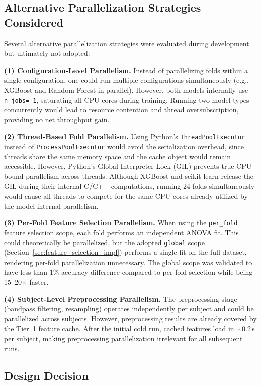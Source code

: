 \subsection{Alternative Parallelization Strategies Considered}
\label{subsec:alt_parallel}

Several alternative parallelization strategies were evaluated during development but ultimately not adopted:

\textbf{(1) Configuration-Level Parallelism.}
Instead of parallelizing folds within a single configuration, one could run multiple configurations simultaneously (e.g., XGBoost and Random Forest in parallel). However, both models internally use \texttt{n\_jobs=-1}, saturating all CPU cores during training. Running two model types concurrently would lead to resource contention and thread oversubscription, providing no net throughput gain.

\textbf{(2) Thread-Based Fold Parallelism.}
Using Python's \texttt{ThreadPoolExecutor} instead of \texttt{ProcessPoolExecutor} would avoid the serialization overhead, since threads share the same memory space and the cache object would remain accessible. However, Python's Global Interpreter Lock (GIL) prevents true CPU-bound parallelism across threads. Although XGBoost and scikit-learn release the GIL during their internal C/C++ computations, running 24 folds simultaneously would cause all threads to compete for the same CPU cores already utilized by the model-internal parallelism.

\textbf{(3) Per-Fold Feature Selection Parallelism.}
When using the \texttt{per\_fold} feature selection scope, each fold performs an independent ANOVA fit. This could theoretically be parallelized, but the adopted \texttt{global} scope (Section~\ref{sec:feature_selection_impl}) performs a single fit on the full dataset, rendering per-fold parallelization unnecessary. The global scope was validated to have less than 1\% accuracy difference compared to per-fold selection while being 15--20$\times$ faster.

\textbf{(4) Subject-Level Preprocessing Parallelism.}
The preprocessing stage (bandpass filtering, resampling) operates independently per subject and could be parallelized across subjects. However, preprocessing results are already covered by the Tier~1 feature cache. After the initial cold run, cached features load in $\sim$0.2\,s per subject, making preprocessing parallelization irrelevant for all subsequent runs.

\subsection{Design Decision}
\label{subsec:parallel_decision}

